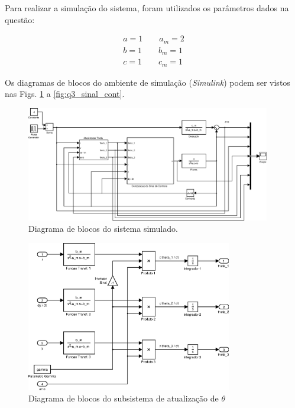 Para realizar a simulação do sistema, foram utilizados os parâmetros dados na
questão:

\begin{eqnarray}
a = 1 \qquad a_m = 2\\
b = 1 \qquad b_m = 1\\
c = 1 \qquad c_m = 1
\end{eqnarray}

Os diagramas de blocos do ambiente de simulação ({\it Simulink}) podem ser
vistos nas Figs. \ref{fig:q3_sistema} a \ref{fig:q3_sinal_cont}.

\begin{figure}[htb]
    \centering
    \includegraphics[width=0.95\textwidth]{imgs/questao3/sistema}
    \caption{Diagrama de blocos do sistema simulado.}
    \label{fig:q3_sistema}
\end{figure}

\begin{figure}[H]
    \centering
    \includegraphics[width=0.8\textwidth]{imgs/questao3/theta}
    \caption{Diagrama de blocos do subsistema de atualização de $\theta$}
    \label{fig:q3_theta}
\end{figure}

